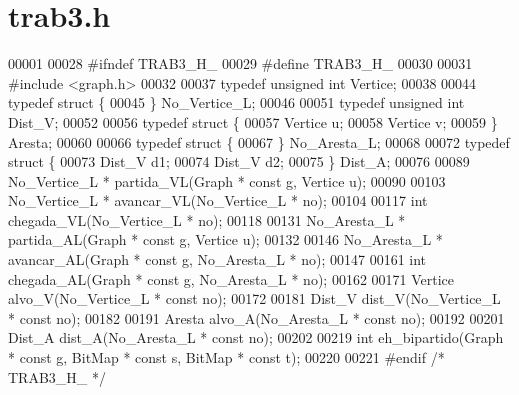 \section{trab3.\+h}
\label{trab3_8h_source}

\begin{DoxyCode}
00001 
00028 \textcolor{preprocessor}{#ifndef TRAB3\_H\_}
00029 \textcolor{preprocessor}{#define TRAB3\_H\_}
00030 
00031 \textcolor{preprocessor}{#include <graph.h>}
00032 
00037 \textcolor{keyword}{typedef} \textcolor{keywordtype}{unsigned} \textcolor{keywordtype}{int} Vertice;
00038 
00044 \textcolor{keyword}{typedef} \textcolor{keyword}{struct }\{
00045 \} No_Vertice_L;
00046 
00051 \textcolor{keyword}{typedef} \textcolor{keywordtype}{unsigned} \textcolor{keywordtype}{int} Dist_V;
00052 
00056 \textcolor{keyword}{typedef} \textcolor{keyword}{struct }\{
00057         Vertice u; 
00058         Vertice v; 
00059 \} Aresta;
00060 
00066 \textcolor{keyword}{typedef} \textcolor{keyword}{struct }\{
00067 \} No_Aresta_L;
00068 
00072 \textcolor{keyword}{typedef} \textcolor{keyword}{struct }\{
00073         Dist_V d1; 
00074         Dist_V d2; 
00075 \} Dist_A;
00076 
00089 No_Vertice_L * partida_VL(Graph * \textcolor{keyword}{const} g, Vertice u);
00090 
00103 No_Vertice_L * avancar_VL(No_Vertice_L * no);
00104 
00117 \textcolor{keywordtype}{int} chegada_VL(No_Vertice_L * no);
00118 
00131 No_Aresta_L * partida_AL(Graph * \textcolor{keyword}{const} g, Vertice u);
00132 
00146 No_Aresta_L * avancar_AL(Graph * \textcolor{keyword}{const} g, No_Aresta_L * no);
00147 
00161 \textcolor{keywordtype}{int} chegada_AL(Graph * \textcolor{keyword}{const} g, No_Aresta_L * no);
00162 
00171 Vertice alvo_V(No_Vertice_L * \textcolor{keyword}{const} no);
00172 
00181 Dist_V dist_V(No_Vertice_L * \textcolor{keyword}{const} no);
00182 
00191 Aresta alvo_A(No_Aresta_L * \textcolor{keyword}{const} no);
00192 
00201 Dist_A dist_A(No_Aresta_L * \textcolor{keyword}{const} no);
00202 
00219 \textcolor{keywordtype}{int} eh_bipartido(Graph * \textcolor{keyword}{const} g, BitMap * \textcolor{keyword}{const} s, BitMap * \textcolor{keyword}{const} t);
00220 
00221 \textcolor{preprocessor}{#endif }\textcolor{comment}{/* TRAB3\_H\_ */}\textcolor{preprocessor}{}
\end{DoxyCode}
